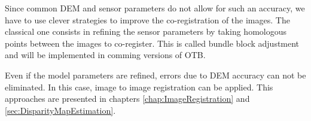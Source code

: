 Since common DEM and sensor parameters do not allow for such an
accuracy, we have to use clever strategies to improve the
co-registration of the images. The classical one consists in refining
the sensor parameters by taking homologous points between the images
to co-register. This is called bundle block adjustment and will be
implemented in comming versions of OTB.

Even if the model parameters are refined, errors due to DEM accuracy
can not be eliminated. In this case, image to image registration can
be applied. This approaches are presented in chapters
\ref{chap:ImageRegistration} and \ref{sec:DisparityMapEstimation}.





    
    
    
    
    
